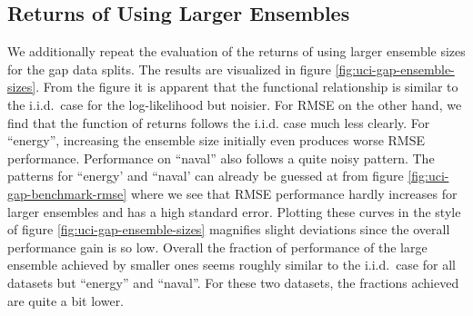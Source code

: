 \documentclass[../thesis.tex]{subfiles}
\begin{document}
\subsection*{Returns of Using Larger Ensembles}
We additionally repeat the evaluation of the returns of using larger ensemble sizes for the gap data splits. The results are visualized in figure \ref{fig:uci-gap-ensemble-sizes}. From the figure it is apparent that the functional relationship is similar to the i.i.d.\ case for the log-likelihood but noisier. For RMSE on the other hand, we find that the function of returns follows the i.i.d. case much less clearly. For ``energy'', increasing the ensemble size initially even produces worse RMSE performance. Performance on ``naval'' also follows a quite noisy pattern. The patterns for ``energy' and ``naval' can already be guessed at from figure \ref{fig:uci-gap-benchmark-rmse} where we see that RMSE performance hardly increases for larger ensembles and has a high standard error. Plotting these curves in the style of figure \ref{fig:uci-gap-ensemble-sizes} magnifies slight deviations since the overall performance gain is so low. Overall the fraction of performance of the large ensemble achieved by smaller ones seems roughly similar to the i.i.d.\ case for all datasets but ``energy'' and ``naval''. For these two datasets, the fractions achieved are quite a bit lower.
\end{document}
